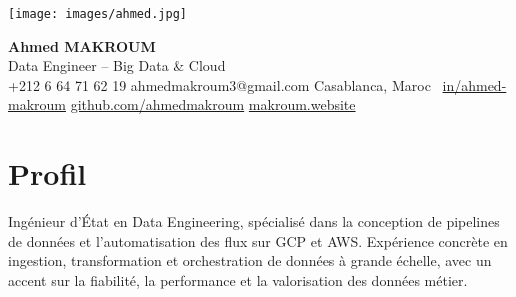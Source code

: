 \documentclass[11pt,a4paper,sans]{moderncv}
\begin{document}
  \raggedright

  \hspace*{0.03\textwidth}%
  \begin{minipage}[c]{0.13\textwidth}
    \texttt{[image: images/ahmed.jpg]}
  \end{minipage}%
  \hfill
  \begin{minipage}[c]{0.84\textwidth}
    \begin{center}
      {\fontsize{20}{22}\selectfont\textbf{Ahmed MAKROUM}}\\[0.7em]
      {\fontsize{13.2}{15.4}\selectfont  Data Engineer – Big Data \& Cloud} \\[0.5em] %
      {\fontsize{10.5}{12.3}\selectfont
        \faMobile\enspace +212 6 64 71 62 19 \quad
        \faEnvelope\enspace ahmedmakroum3@gmail.com \quad
        \faHome\enspace Casablanca, Maroc \
        \faLinkedin\enspace \href{https://www.linkedin.com/in/ahmed-makroum/}{in/ahmed-makroum} \quad
        \faGithub\enspace \href{https://github.com/ahmedmakroum}{github.com/ahmedmakroum}\quad
        \faGlobe\enspace \href{https://makroum.website}{makroum.website}
      }\\[1em]
    \end{center}
  \end{minipage}
  \vspace{-11pt}

  \section{\fontsize{11}\selectfont Profil}
  \vspace{-6pt}
Ingénieur d’État en Data Engineering, spécialisé dans la conception de pipelines de données et l’automatisation des flux sur GCP et AWS. Expérience concrète en ingestion, transformation et orchestration de données à grande échelle, avec un accent sur la fiabilité, la performance et la valorisation des données métier.
\end{document}

